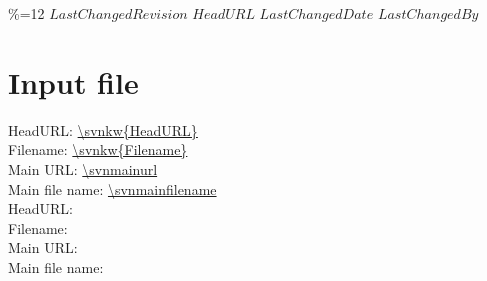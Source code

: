 \begingroup
\catcode\%=12
\svnidlong
{$LastChangedRevision$}
{$HeadURL$}
{$LastChangedDate$}
{$LastChangedBy$}
\endgroup


\section{Input file}

\noindent
HeadURL: \url{\svnkw{HeadURL}} \\
Filename: \url{\svnkw{Filename}} \\
Main URL: \url{\svnmainurl} \\
Main file name: \url{\svnmainfilename} \\

\noindent
HeadURL:  \\
Filename:  \\
Main URL: \svnnolinkurl{\svnmainurl} \\
Main file name: \svnnolinkurl{\svnmainfilename} \\

